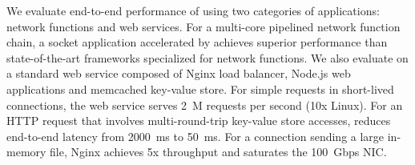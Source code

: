 We evaluate end-to-end performance of \sys{} using two categories of applications: network functions and web services. For a multi-core pipelined network function chain, a socket application accelerated by \sys{} achieves superior performance than state-of-the-art frameworks specialized for network functions. We also evaluate \sys{} on a standard web service composed of Nginx load balancer, Node.js web applications and memcached key-value store. For simple requests in short-lived connections, the web service serves 2~M requests per second (10x Linux). For an HTTP request that involves multi-round-trip key-value store accesses, \sys{} reduces end-to-end latency from 2000~ms to 50~ms. For a connection sending a large in-memory file, Nginx achieves 5x throughput and saturates the 100~Gbps NIC.
